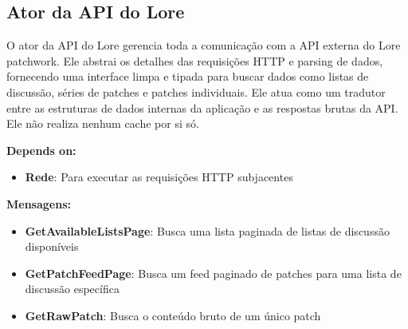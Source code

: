 \subsection{Ator da API do Lore}

O ator da API do Lore gerencia toda a comunicação com a API externa do Lore patchwork. Ele abstrai os detalhes das requisições HTTP e parsing de dados, fornecendo uma interface limpa e tipada para buscar dados como listas de discussão, séries de patches e patches individuais. Ele atua como um tradutor entre as estruturas de dados internas da aplicação e as respostas brutas da API. Ele não realiza nenhum cache por si só.

\textbf{Depends on:}

\begin{itemize}
    \item \textbf{Rede}: Para executar as requisições HTTP subjacentes
\end{itemize}

\textbf{Mensagens:}

\begin{itemize}
    \item \textbf{GetAvailableListsPage}: Busca uma lista paginada de listas de discussão disponíveis
    \item \textbf{GetPatchFeedPage}: Busca um feed paginado de patches para uma lista de discussão específica
    \item \textbf{GetRawPatch}: Busca o conteúdo bruto de um único patch
\end{itemize}

